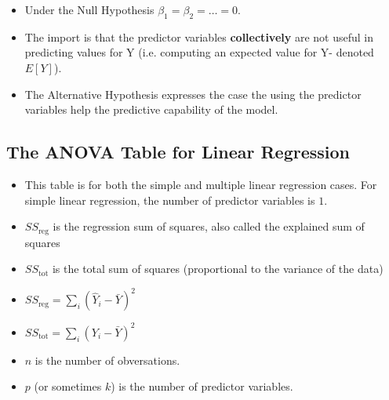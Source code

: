 \documentclass[a4paper,12pt]{article}
\begin{document}
\begin{itemize}
\item Under the Null Hypothesis $\beta_1 = \beta_2 = \ldots = 0$. 
\item The import is that the predictor variables \textbf{collectively} are not useful in predicting values for Y
(i.e. computing an expected value for Y- denoted $E[Y]$). 
\item The Alternative Hypothesis expresses the case the using the predictor variables help the predictive capability of the model.
\end{itemize}

\newpage

\subsection*{The ANOVA Table for Linear Regression }
\begin{itemize}
\item	This table is for both the simple and multiple linear regression cases. For simple linear regression, the number of predictor variables is $1$.
\end{itemize}
\begin{itemize}
	\item $SS_\textrm{reg}$ is the regression sum of squares, also called the explained sum of squares
	\item $SS_\textrm{tot}$ is the total sum of squares (proportional to the variance of the data)
	\item $SS_\textrm{reg}=\sum_i (\hat{Y}_i-\bar{Y})^2$
	\item $SS_\textrm{tot}=\sum_i (Y_i-\bar{Y})^2$
	\item $n$ is the number of obversations.
	\item $p$ (or sometimes $k$) is the number of predictor variables.
\end{itemize}
\bigskip
\end{document}

